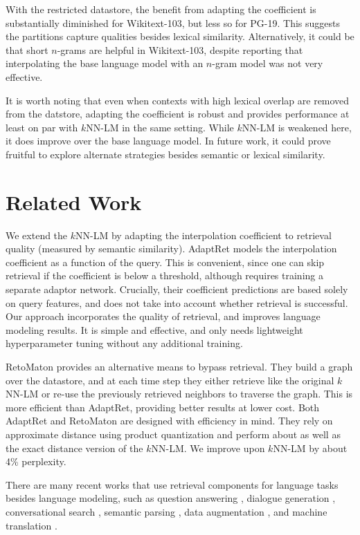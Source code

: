 \documentclass[11pt]{article}
\begin{document}
With the restricted datastore, the benefit from adapting the coefficient is substantially diminished for Wikitext-103, but less so for PG-19. This suggests the partitions capture qualities besides lexical similarity. Alternatively, it could be that short $n$-grams are helpful in Wikitext-103, despite \citet{khandelwal20generalization} reporting that interpolating the base language model with an $n$-gram model was not very effective.

It is worth noting that even when contexts with high lexical overlap are removed from the datstore, adapting the coefficient is robust and provides performance at least on par with $k$NN-LM in the same setting. While $k$NN-LM is weakened here, it does improve over the base language model. In future work, it could prove fruitful to explore alternate strategies besides semantic or lexical similarity.



\section{Related Work}


We extend the $k$NN-LM by adapting the interpolation coefficient to retrieval quality (measured by semantic similarity).
AdaptRet \cite{He2021EfficientNN} models the interpolation coefficient as a function of the query. This is convenient, since one can skip retrieval if the coefficient is below a threshold, although requires training a separate adaptor network. Crucially, their coefficient predictions are based solely on query features, and does not take into account whether retrieval is successful. Our approach incorporates the quality of retrieval, and improves language modeling results. It is simple and effective, and only needs lightweight hyperparameter tuning without any additional training.

RetoMaton \cite{Alon2022NeuroSymbolicLM} provides an alternative means to bypass retrieval. They build a graph over the datastore, and at each time step they either retrieve like the original $k$NN-LM or re-use the previously retrieved neighbors to traverse the graph. This is more efficient than AdaptRet, providing better results at lower cost. Both AdaptRet and RetoMaton are designed with efficiency in mind. They rely on approximate distance using product quantization and perform about as well as the exact distance version of the $k$NN-LM. We improve upon $k$NN-LM by about 4\% perplexity.


There are many recent works that use retrieval components for language tasks besides language modeling, such as question answering \citep{Godbole2019MultistepEI,Guu2020REALMRL, kassner-schutze-2020-bert}, dialogue generation \citep{Fan2021AugmentingTW}, conversational search \cite{Hashemi2020GuidedTL}, semantic parsing \citep{Gupta2021RETRONLURA}, data augmentation \cite{Du2021SelftrainingIP}, and machine translation \cite{khandelwal2021nearest,zheng-etal-2021-adaptive,chunkMT2022}. 
\end{document}
